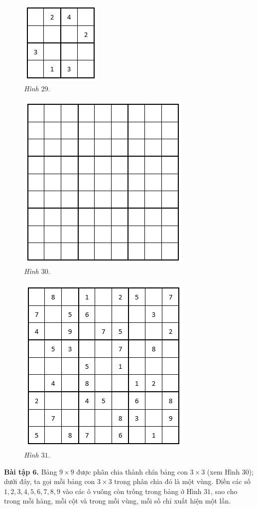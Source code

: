 	\begin{multicols}{3}
		\begin{figure}[H]
			\centering
			\vspace*{-5pt}
			\captionsetup{labelformat= empty, justification=centering}
			\includegraphics[height=0.27\textwidth]{pic18}
			\caption{\small\textit{Hình $29.$}}
			\vspace*{-10pt}
		\end{figure}
		\begin{figure}[H]
			\centering
			\vspace*{-5pt}
			\captionsetup{labelformat= empty, justification=centering}
			\includegraphics[height=0.27\textwidth]{pic21}
			\caption{\small\textit{Hình $30.$}}
			\vspace*{-10pt}
		\end{figure}
		\begin{figure}[H]
			\centering
			\vspace*{-5pt}
			\captionsetup{labelformat= empty, justification=centering}
			\includegraphics[height=0.27\textwidth]{pic22}
			\caption{\small\textit{ Hình $31.$}}
			\vspace*{-10pt}
		\end{figure}
	\end{multicols}
	\textbf{Bài tập $\pmb{6}$.} Bảng $9\times9$ được phân chia thành chín bảng con $3\times3$ (xem Hình $30$); dưới đây, ta gọi mỗi bảng con $3\times3$ trong phân chia đó là  một vùng.
	\vskip 0.1cm
	Điền các số $1, 2, 3, 4, 5, 6, 7, 8, 9$ vào các ô vuông còn trống trong bảng ở Hình $31$, sao cho trong mỗi hàng, mỗi cột và trong mỗi vùng, mỗi số chỉ xuất hiện một lần.